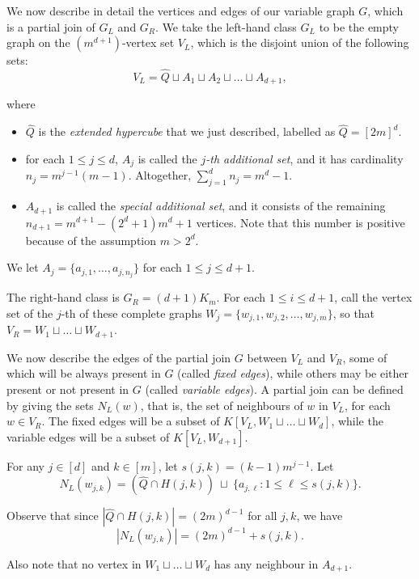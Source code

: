 \documentclass[10pt,a4paper]{article}
\numberwithin{equation}{section}
\begin{document}
We now describe in detail the vertices and edges of our variable graph $G$, which is a partial join of $G_L$ and $G_R$. We take the left-hand class $G_L$ to be the empty graph on the $(m^{d+1})$-vertex set $V_L$, which is the disjoint union of the following sets:
$$V_L=\widehat{Q} \sqcup A_1\sqcup A_2\sqcup \ldots\sqcup A_{d+1},$$

\noindent where
\begin{itemize}
\itemsep0em
\item $\widehat{Q}$ is the \textit{extended hypercube} that we just described, labelled as $\widehat{Q}=[2m]^d$.
\item for each $1\le j\le d$, $A_j$ is called the \textit{$j$-th additional set}, and it has cardinality $n_j=m^{j-1}(m-1)$. Altogether, $\sum_{j=1}^d n_j=m^d-1$.
\item $A_{d+1}$ is called the \textit{special additional set}, and it consists of the remaining $n_{d+1}=m^{d+1}-(2^d+1)m^d+1$ vertices. Note that this number is positive because of the assumption $m>2^d$.
\end{itemize}

\noindent We let $A_j=\{a_{j,1}, \dots, a_{j,n_j}\}$ for each $1\le j\le d+1$.

The right-hand class is $G_R=(d+1)K_m$. For each $1\le i\le d+1$, call the vertex set of the $j$-th of these complete graphs $W_j=\{w_{j,1}, w_{j,2}, \ldots, w_{j,m}\}$, so that $V_R=W_1\sqcup \ldots \sqcup W_{d+1}$.\bigskip

\noindent We now describe the edges of the partial join $G$ between $V_L$ and $V_R$, some of which will be always present in $G$ (called \textit{fixed edges}), while others may be either present or not present in $G$ (called \textit{variable edges}). A partial join can be defined by giving the sets $N_L(w)$, that is, the set of neighbours of $w$ in $V_L$, for each $w\in V_R$. The fixed edges will be a subset of $K[V_L, W_1\sqcup \ldots\sqcup W_d]$, while the variable edges will be a subset of $K[V_L, W_{d+1}]$.\bigskip

\noindent For any $j\in [d]$ and $k\in [m]$, let $s(j,k)=(k-1)m^{j-1}$. Let
$$N_L(w_{j,k})=\left(\widehat{Q}\cap H(j,k)\right) ~\sqcup~ \{a_{j,\ell}: 1\le \ell\le s(j,k)\}.$$

\noindent Observe that since $|\widehat{Q}\cap H(j,k)|=(2m)^{d-1}$ for all $j,k$, we have
$$|N_L(w_{j,k})|=(2m)^{d-1}+s(j,k).$$

\noindent Also note that no vertex in $W_1\sqcup \ldots\sqcup W_d$ has any neighbour in $A_{d+1}$.\bigskip
\end{document}
